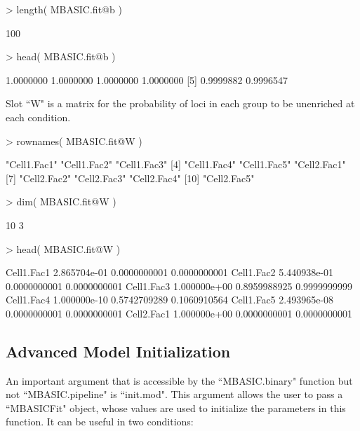 \documentclass[a4paper,10pt]{article}
\begin{document}
\begin{Schunk}
\begin{Sinput}
> length( MBASIC.fit@b )
\end{Sinput}
\begin{Soutput}
[1] 100
\end{Soutput}
\begin{Sinput}
> head( MBASIC.fit@b )
\end{Sinput}
\begin{Soutput}
[1] 1.0000000 1.0000000 1.0000000 1.0000000
[5] 0.9999882 0.9996547
\end{Soutput}
\end{Schunk}

Slot ``W" is a matrix for the probability of loci in each group to be unenriched at each condition.

\begin{Schunk}
\begin{Sinput}
> rownames( MBASIC.fit@W )
\end{Sinput}
\begin{Soutput}
 [1] "Cell1.Fac1" "Cell1.Fac2" "Cell1.Fac3"
 [4] "Cell1.Fac4" "Cell1.Fac5" "Cell2.Fac1"
 [7] "Cell2.Fac2" "Cell2.Fac3" "Cell2.Fac4"
[10] "Cell2.Fac5"
\end{Soutput}
\begin{Sinput}
> dim( MBASIC.fit@W )
\end{Sinput}
\begin{Soutput}
[1] 10  3
\end{Soutput}
\begin{Sinput}
> head( MBASIC.fit@W )
\end{Sinput}
\begin{Soutput}
                   [,1]         [,2]         [,3]
Cell1.Fac1 2.865704e-01 0.0000000001 0.0000000001
Cell1.Fac2 5.440938e-01 0.0000000001 0.0000000001
Cell1.Fac3 1.000000e+00 0.8959988925 0.9999999999
Cell1.Fac4 1.000000e-10 0.5742709289 0.1060910564
Cell1.Fac5 2.493965e-08 0.0000000001 0.0000000001
Cell2.Fac1 1.000000e+00 0.0000000001 0.0000000001
\end{Soutput}
\end{Schunk}

\subsection{Advanced Model Initialization}

An important argument that is accessible by the ``MBASIC.binary" function but not ``MBASIC.pipeline" is ``init.mod". This argument allows the user to pass a ``MBASICFit" object, whose values are used to initialize the parameters in this function. It can be useful in two conditions:
\end{document}

